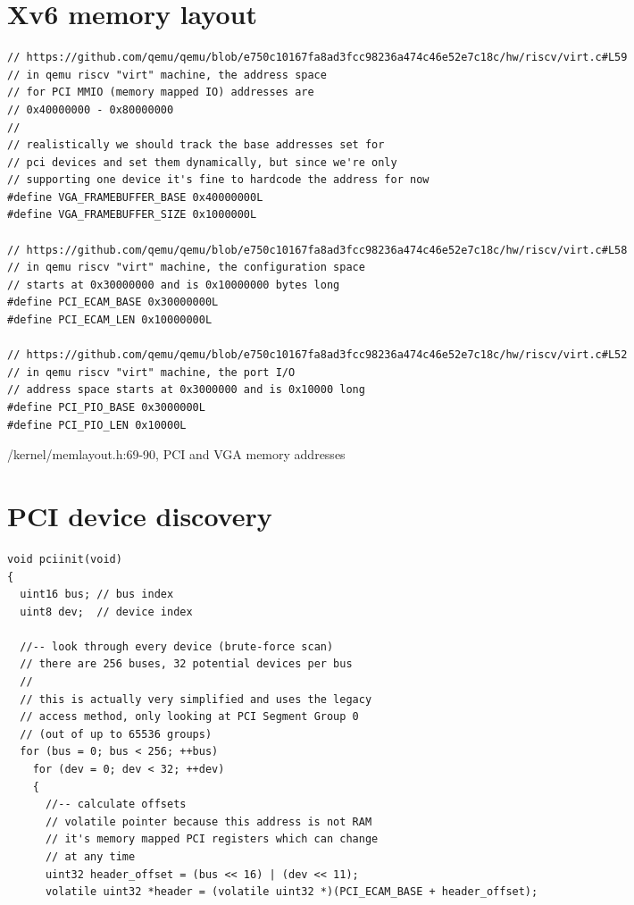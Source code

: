 \begin{appendices}
\section{Xv6 memory layout}
\label{appendix:c:2}
\begin{listing}[H]
\begin{verbatim}
// https://github.com/qemu/qemu/blob/e750c10167fa8ad3fcc98236a474c46e52e7c18c/hw/riscv/virt.c#L59
// in qemu riscv "virt" machine, the address space
// for PCI MMIO (memory mapped IO) addresses are
// 0x40000000 - 0x80000000
//
// realistically we should track the base addresses set for
// pci devices and set them dynamically, but since we're only
// supporting one device it's fine to hardcode the address for now
#define VGA_FRAMEBUFFER_BASE 0x40000000L
#define VGA_FRAMEBUFFER_SIZE 0x1000000L

// https://github.com/qemu/qemu/blob/e750c10167fa8ad3fcc98236a474c46e52e7c18c/hw/riscv/virt.c#L58
// in qemu riscv "virt" machine, the configuration space
// starts at 0x30000000 and is 0x10000000 bytes long
#define PCI_ECAM_BASE 0x30000000L
#define PCI_ECAM_LEN 0x10000000L

// https://github.com/qemu/qemu/blob/e750c10167fa8ad3fcc98236a474c46e52e7c18c/hw/riscv/virt.c#L52
// in qemu riscv "virt" machine, the port I/O
// address space starts at 0x3000000 and is 0x10000 long
#define PCI_PIO_BASE 0x3000000L
#define PCI_PIO_LEN 0x10000L
\end{verbatim}
\caption{/kernel/memlayout.h:69-90, PCI and VGA memory addresses}
\end{listing}

\section{PCI device discovery}
\label{appendix:c:3}
\begin{listing}[H]
    \begin{verbatim}
void pciinit(void)
{
  uint16 bus; // bus index
  uint8 dev;  // device index

  //-- look through every device (brute-force scan)
  // there are 256 buses, 32 potential devices per bus
  //
  // this is actually very simplified and uses the legacy
  // access method, only looking at PCI Segment Group 0
  // (out of up to 65536 groups)
  for (bus = 0; bus < 256; ++bus)
    for (dev = 0; dev < 32; ++dev)
    {
      //-- calculate offsets
      // volatile pointer because this address is not RAM
      // it's memory mapped PCI registers which can change
      // at any time
      uint32 header_offset = (bus << 16) | (dev << 11);
      volatile uint32 *header = (volatile uint32 *)(PCI_ECAM_BASE + header_offset);


\end{verbatim}
\end{listing}
\end{appendices}
